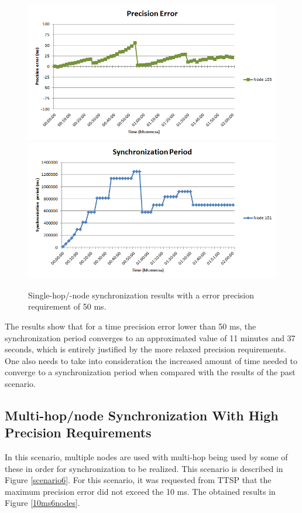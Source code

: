 \begin{figure}[!htb]
\begin{center}
\includegraphics[scale=0.4]{./images/20-ttsp-50ms2nodes-error.png}
\includegraphics[scale=0.4]{./images/21-ttsp-50ms2nodes-period.png}
\end{center}
\caption{Single-hop/-node synchronization results with a error precision requirement of 50 ms.}
\label{50ms2nodes}
\end{figure}

The results show that for a time precision error lower than 50 ms, the synchronization period converges to an approximated value of 11 minutes and 37 seconds, which is entirely justified by the more relaxed precision requirements. One also needs to take into consideration the increased amount of time needed to converge to a synchronization period when compared with the results of the past scenario.

\subsection{Multi-hop/node Synchronization With High Precision Requirements}
In this scenario, multiple nodes are used with multi-hop being used by some of these in order for synchronization to be realized. This scenario is described in Figure \ref{scenario6}. For this scenario, it was requested from TTSP that the maximum precision error did not exceed the 10 ms. The obtained results in Figure \ref{10ms6nodes}.

